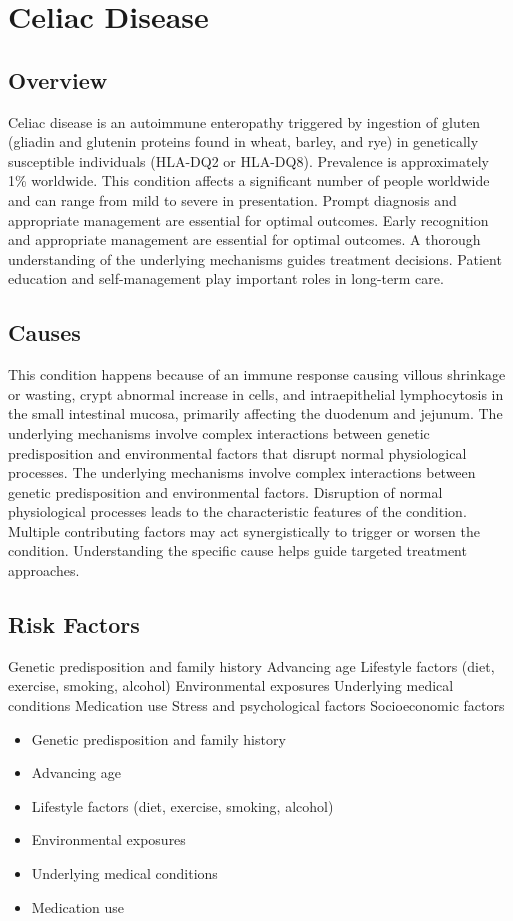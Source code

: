\chapter{Celiac Disease}
\label{sec:Celiac Disease}

\section{Overview}
Celiac disease is an autoimmune enteropathy triggered by ingestion of gluten (gliadin and glutenin proteins found in wheat, barley, and rye) in genetically susceptible individuals (HLA-DQ2 or HLA-DQ8). Prevalence is approximately 1\% worldwide. This condition affects a significant number of people worldwide and can range from mild to severe in presentation. Prompt diagnosis and appropriate management are essential for optimal outcomes. Early recognition and appropriate management are essential for optimal outcomes. A thorough understanding of the underlying mechanisms guides treatment decisions. Patient education and self-management play important roles in long-term care.
\section{Causes}
This condition happens because of an immune response causing villous shrinkage or wasting, crypt abnormal increase in cells, and intraepithelial lymphocytosis in the small intestinal mucosa, primarily affecting the duodenum and jejunum. The underlying mechanisms involve complex interactions between genetic predisposition and environmental factors that disrupt normal physiological processes. The underlying mechanisms involve complex interactions between genetic predisposition and environmental factors. Disruption of normal physiological processes leads to the characteristic features of the condition. Multiple contributing factors may act synergistically to trigger or worsen the condition. Understanding the specific cause helps guide targeted treatment approaches.
\section{Risk Factors}
Genetic predisposition and family history Advancing age Lifestyle factors (diet, exercise, smoking, alcohol) Environmental exposures Underlying medical conditions Medication use Stress and psychological factors Socioeconomic factors

\begin{itemize}[noitemsep]
  \item Genetic predisposition and family history
  \item Advancing age
  \item Lifestyle factors (diet, exercise, smoking, alcohol)
  \item Environmental exposures
  \item Underlying medical conditions
  \item Medication use
\end{itemize}
